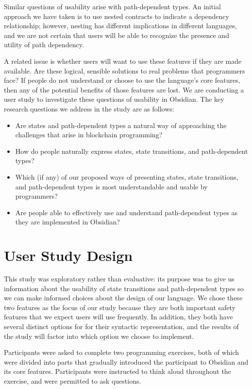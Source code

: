 \documentclass[sigplan,10pt,review]{acmart}\settopmatter{printfolios=true}
\begin{document}
Similar questions of usability arise with path-dependent types. An initial approach we have taken is 
to use nested contracts to indicate a dependency relationship; however, nesting has different 
implications in different languages, and we are not certain that users will be able to recognize the 
presence and utility of path dependency. 

	A related issue is whether users will want to use these features if they are made available. Are 
these logical, sensible solutions to real problems that programmers face? If people do not 
understand or choose to use the language's core features, then any of the potential benefits 
of those features are lost. 
	We are conducting a user study \cite{Myers} to investigate these questions of usability in Obsidian. The 
key research questions we address in the study are as follows: 
\begin{itemize}
\item Are states and path-dependent types a natural way of 
	approaching the challenges that arise in blockchain programming?
\item How do people naturally express states, state transitions, and path-dependent types?
\item Which (if any) of our proposed ways of presenting states, state transitions, and path-dependent types
	is most understandable and usable by programmers?
\item Are people able to effectively use and understand path-dependent types as they
are implemented in Obsidian?
\end{itemize}

\section{User Study Design}
	
This study was exploratory rather than evaluative: its purpose was to give us information about the usability of state transitions 
and path-dependent types so we can make informed choices about the design of our language. 
We chose these two features as the focus of our study because they are both important safety features 
that we expect users will use frequently. In addition, they both have several distinct options for for their syntactic representation, and the results of the study will factor into which option we choose to implement.  

Participants were asked to complete two programming exercises, both of which were divided into parts that 
gradually introduced the participant to Obsidian and its core features. 
Participants were instructed to think aloud throughout the exercise, and were permitted to ask questions.
\end{document}
